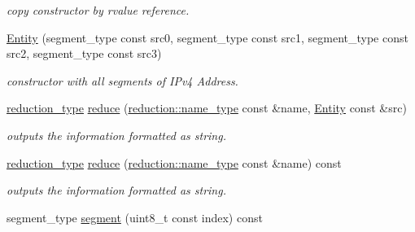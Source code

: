 \begin{DoxyCompactItemize}
\begin{DoxyCompactList}\small\item\em copy constructor by rvalue reference. \end{DoxyCompactList}\item 
\hypertarget{classhryky_1_1ip_1_1v4_1_1_entity_ad69d9241af632a2cae3f15ee00b20c6a}{\hyperlink{classhryky_1_1ip_1_1v4_1_1_entity_ad69d9241af632a2cae3f15ee00b20c6a}{Entity} (segment\-\_\-type const src0, segment\-\_\-type const src1, segment\-\_\-type const src2, segment\-\_\-type const src3)}\label{classhryky_1_1ip_1_1v4_1_1_entity_ad69d9241af632a2cae3f15ee00b20c6a}

\begin{DoxyCompactList}\small\item\em constructor with all segments of I\-Pv4 Address. \end{DoxyCompactList}\item 
\hypertarget{classhryky_1_1ip_1_1v4_1_1_entity_a451db2f2014de0b0f6615ee0dd87c597}{\hyperlink{namespacehryky_a343a9a4c36a586be5c2693156200eadc}{reduction\-\_\-type} \hyperlink{classhryky_1_1ip_1_1v4_1_1_entity_a451db2f2014de0b0f6615ee0dd87c597}{reduce} (\hyperlink{namespacehryky_1_1reduction_ac686c30a4c8d196bbd0f05629a6b921f}{reduction\-::name\-\_\-type} const \&name, \hyperlink{classhryky_1_1ip_1_1v4_1_1_entity}{Entity} const \&src)}\label{classhryky_1_1ip_1_1v4_1_1_entity_a451db2f2014de0b0f6615ee0dd87c597}

\begin{DoxyCompactList}\small\item\em outputs the information formatted as string. \end{DoxyCompactList}\item 
\hypertarget{classhryky_1_1ip_1_1v4_1_1_entity_af3e7974c1f3db2df82e55ec93e69535e}{\hyperlink{namespacehryky_a343a9a4c36a586be5c2693156200eadc}{reduction\-\_\-type} \hyperlink{classhryky_1_1ip_1_1v4_1_1_entity_af3e7974c1f3db2df82e55ec93e69535e}{reduce} (\hyperlink{namespacehryky_1_1reduction_ac686c30a4c8d196bbd0f05629a6b921f}{reduction\-::name\-\_\-type} const \&name) const }\label{classhryky_1_1ip_1_1v4_1_1_entity_af3e7974c1f3db2df82e55ec93e69535e}

\begin{DoxyCompactList}\small\item\em outputs the information formatted as string. \end{DoxyCompactList}\item 
\hypertarget{classhryky_1_1ip_1_1v4_1_1_entity_a76958c6a4a54d81c61e050581a877c91}{segment\-\_\-type \hyperlink{classhryky_1_1ip_1_1v4_1_1_entity_a76958c6a4a54d81c61e050581a877c91}{segment} (uint8\-\_\-t const index) const }\label{classhryky_1_1ip_1_1v4_1_1_entity_a76958c6a4a54d81c61e050581a877c91}


\end{DoxyCompactItemize}
